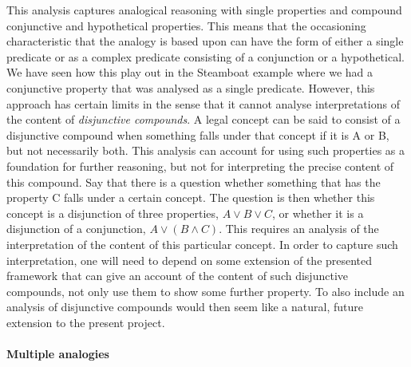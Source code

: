 				This analysis captures analogical reasoning with single properties and compound conjunctive and hypothetical properties. This means that the occasioning characteristic that the analogy is based upon can have the form of either a single predicate or as a complex predicate consisting of a conjunction or a hypothetical. We have seen how this play out in the Steamboat example where we had a conjunctive property that was analysed as a single predicate. However, this approach has certain limits in the sense that it cannot analyse interpretations of the content of \textit{disjunctive compounds}. A legal concept can be said to consist of a disjunctive compound when something falls under that concept if it is A or B, but not necessarily both. This analysis can account for using such properties as a foundation for further reasoning, but not for interpreting the precise content of this compound. Say that there is a question whether something that has the property C falls under a certain concept. The question is then whether this concept is a disjunction of three properties, $A \lor B \lor C$, or whether it is a disjunction of a conjunction, $A \lor (B \land C)$. This requires an analysis of the interpretation of the content of this particular concept. In order to capture such interpretation, one will need to depend on some extension of the presented framework that can give an account of the content of such disjunctive compounds, not only use them to show some further property. To also include an analysis of disjunctive compounds would then seem like a natural, future extension to the present project. 
				
				\paragraph{Multiple analogies}
				
